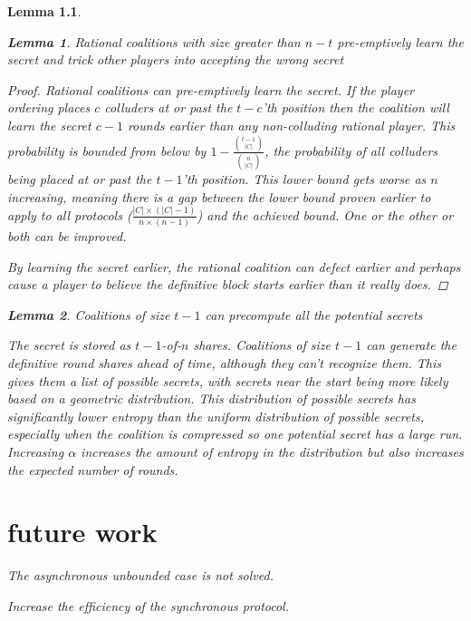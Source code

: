 \documentclass{dalcsthesis}
\newtheorem{lemma}{Lemma}
\begin{document}
\begin{lemma}
\begin{lemma} Rational coalitions with size greater than $n-t$ pre-emptively learn the secret and trick other players into accepting the wrong secret \end{lemma}
\begin{proof}
Rational coalitions can pre-emptively learn the secret. If the player ordering places $c$ colluders at or past the $t-c$'th position then the coalition will learn the secret $c-1$ rounds earlier than any non-colluding rational player. This probability is bounded from below by $1 - \frac{{t - 1 \choose |C|}}{{n \choose |C|}}$, the probability of all colluders being placed at or past the $t-1$'th position. This lower bound gets worse as $n$ increasing, meaning there is a gap between the lower bound proven earlier to apply to all protocols ($\frac{|C| \times (|C|-1)}{n \times (n-1)}$) and the achieved bound. One or the other or both can be improved.

By learning the secret earlier, the rational coalition can defect earlier and perhaps cause a player to believe the definitive block starts earlier than it really does.
\end{proof}

\begin{lemma} Coalitions of size $t-1$ can precompute all the potential secrets \end{lemma}

The secret is stored as $t-1$-of-$n$ shares. Coalitions of size $t-1$ can generate the definitive round shares ahead of time, although they can't recognize them. This gives them a list of possible secrets, with secrets near the start being more likely based on a geometric distribution. This distribution of possible secrets has significantly lower entropy than the uniform distribution of possible secrets, especially when the coalition is compressed so one potential secret has a large run. Increasing $\alpha$ increases the amount of entropy in the distribution but also increases the expected number of rounds.





\chapter{future work}

The asynchronous unbounded case is not solved.

Increase the efficiency of the synchronous protocol.


\end{lemma}
\end{document}
